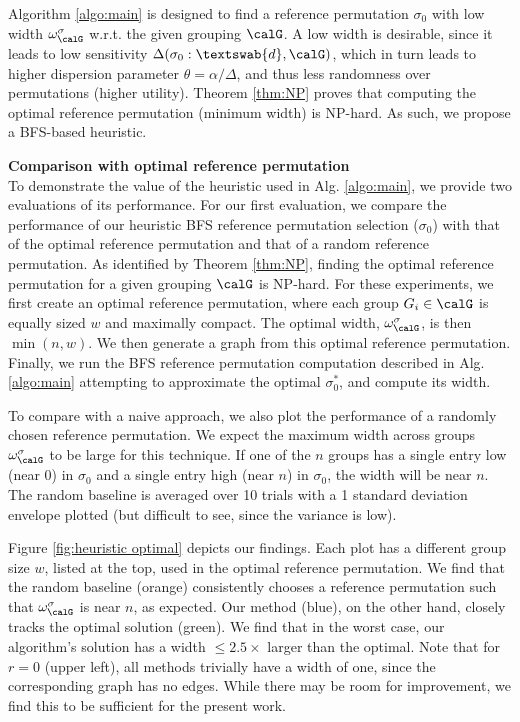 Algorithm \ref{algo:main} is designed to find a reference permutation $\sigma_0$ with low width $\omega_\calG^\sigma$ w.r.t. the given grouping $\calG$. A low width is desirable, since it leads to low sensitivity $\Delta(\sigma_0 : \textswab{d}, \calG)$, which in turn leads to higher dispersion parameter $\theta = \alpha / \Delta$, and thus less randomness over permutations (higher utility). Theorem \ref{thm:NP} proves that computing the optimal reference permutation (minimum width) is NP-hard. As such, we propose a BFS-based heuristic. 

\textbf{Comparison with optimal reference permutation}\\
To demonstrate the value of the heuristic used in Alg. \ref{algo:main}, we provide two evaluations of its performance. 
For our first evaluation, we compare the performance of our heuristic BFS reference permutation selection ($\sigma_0$) with that of the optimal reference permutation  and that of a random reference permutation. As identified by Theorem \ref{thm:NP}, finding the optimal reference permutation for a given grouping $\calG$ is NP-hard. For these experiments, we first create an optimal reference permutation, where each group $G_i \in \calG$ is equally sized $w$ and maximally compact. The optimal width, $\omega_\calG^\sigma$, is then $\min(n, w)$. We then generate a graph from this optimal reference permutation. Finally, we run the BFS reference permutation computation described in Alg. \ref{algo:main} attempting to approximate the optimal $\sigma^*_0$, and compute its width. 

To compare with a naive approach, we also plot the performance of a randomly chosen reference permutation. We expect the maximum width across groups $\omega_\calG^\sigma$ to be large for this technique. If one of the $n$ groups has a single entry low (near 0) in $\sigma_0$ and a single entry high (near $n$) in $\sigma_0$, the width will be near $n$. The random baseline is averaged over 10 trials with a 1 standard deviation envelope plotted (but difficult to see, since the variance is low). 

Figure \ref{fig:heuristic optimal} depicts our findings. Each plot has a different group size $w$, listed at the top, used in the optimal reference permutation. We find that the random baseline (orange) consistently chooses a reference permutation such that $\omega_\calG^\sigma$ is near $n$, as expected. Our method (blue), on the other hand, closely tracks the optimal solution (green). We find that in the worst case, our algorithm's solution has a width $\leq 2.5 \times$ larger than the optimal. Note that for $r = 0$ (upper left), all methods trivially have a width of one, since the corresponding graph has no edges. While there may be room for improvement, we find this to be sufficient for the present work. 

